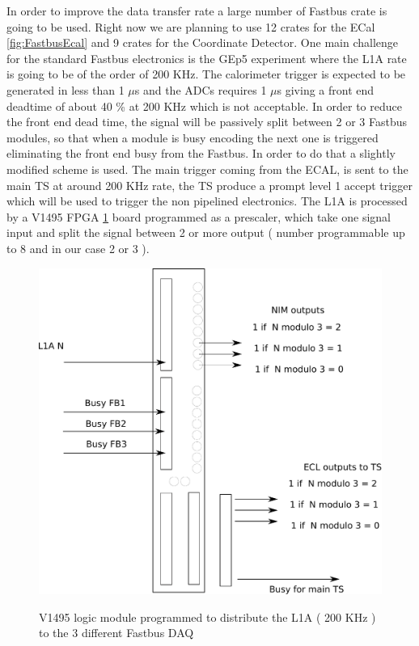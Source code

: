 \documentclass{article}
\begin{document}
In order to improve the data transfer rate a large number of Fastbus crate is going to be used.
Right now we are planning to use 12 crates for the ECal \ref{fig:FastbusEcal} and 9 crates for the Coordinate Detector.
One main challenge for the standard Fastbus electronics is the GEp5 experiment where the L1A rate is going to be of the order of 200 KHz. The calorimeter trigger is expected to be generated in less than 1 $\mu$s and the ADCs requires 1 $\mu$s giving a front end deadtime of about 40 \% at 200 KHz which is not acceptable. In order to reduce the front end dead time, the signal will be passively split between 2 or 3 Fastbus modules, so that when a module is busy encoding the next one is triggered eliminating the front end busy from the Fastbus.
In order to do that a slightly modified scheme is used.
The main trigger coming from the ECAL, is sent to the main TS at around 200 KHz rate, the TS produce a prompt level 1 accept trigger which will be used to trigger the non pipelined electronics. The L1A is processed by a V1495 FPGA \ref{fig:FPGAFlip} board programmed as a prescaler, which take one signal input and split the signal between 2 or more output ( number programmable up to 8 and in our case 2 or 3 ).
\begin{figure}
\includegraphics[scale=0.55]{figs/FPGAFlip.pdf}\\
  \caption{V1495 logic module programmed to distribute the L1A ( 200 KHz ) to the 3 different Fastbus DAQ}\label{fig:FPGAFlip}
\end{figure}
\end{document}
